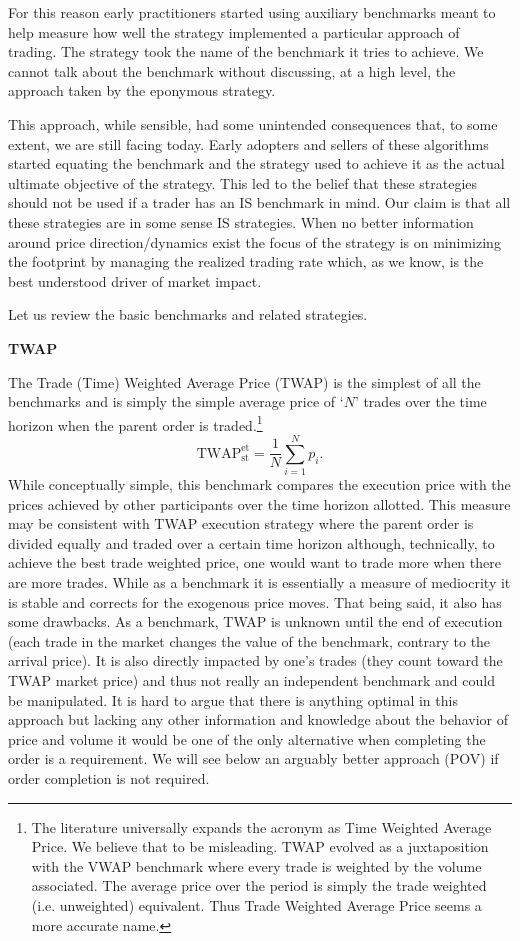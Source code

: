 For this reason early practitioners started using auxiliary benchmarks meant to help measure how well the strategy implemented a particular approach of trading. The strategy took the name of the benchmark it tries to achieve. We cannot talk about the benchmark without discussing, at a high level, the approach taken by the  eponymous strategy.

This approach, while sensible, had some unintended consequences that, to some extent, we are still facing today. Early adopters and sellers of these algorithms started equating the benchmark and the strategy used to achieve it as the actual ultimate objective of the strategy. This led to the belief that these strategies should not be used if a trader has an IS benchmark in mind. Our claim is that all these strategies are in some sense IS strategies. When no better information around price direction/dynamics exist the focus of the strategy is on minimizing the footprint by managing the realized trading rate which, as we know, is the best understood driver of market impact.

Let us review the basic benchmarks and related strategies. \twomedskip

\noindent\textbf{TWAP} \twomedskip

The Trade (Time) Weighted Average Price (TWAP)  is the simplest of all the benchmarks and is simply the simple average price of `$N$' trades over the time horizon when the parent order is traded.\footnote{The literature universally  expands the acronym as Time Weighted Average Price. We believe that to be misleading. TWAP evolved as a juxtaposition with the VWAP benchmark where every trade is weighted by the volume associated. The average price over the period is simply the trade weighted (i.e. unweighted) equivalent. Thus Trade Weighted Average Price seems a more accurate name. }
        \begin{equation}
        \text{TWAP}_{\text{st}} ^{\text{et}}= \frac{1}{N}\sum_{i=1}^N{p_i}.
        \end{equation}
While conceptually simple, this benchmark compares the execution price with the prices achieved by other participants over the time horizon allotted. This measure may be consistent with TWAP execution strategy where the parent order is divided equally and traded over a certain time horizon although, technically, to achieve the best trade weighted price, one would want to trade more when there are more trades. While  as a benchmark it is essentially a measure of mediocrity it is stable and corrects for the exogenous price moves. That being said, it also has some drawbacks. As a benchmark, TWAP is unknown until the end of execution (each trade in the market changes the value of the benchmark, contrary to the arrival price). It is also directly impacted by one's trades (they count toward the TWAP market price) and thus not really an independent benchmark and could be manipulated. 
It is hard to argue that there is anything optimal in this approach but lacking any other information and knowledge about the behavior of price and volume it would be one of the only alternative when completing the order is a requirement. We will see below an arguably better approach (POV) if order completion is not required. 

